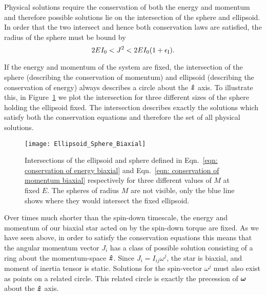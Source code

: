 \documentclass[../full_thesis/full_thesis.tex]{subfiles}
\begin{document}
Physical solutions require the conservation of both
the energy and momentum and therefore possible solutions lie on the intersection
of the sphere and ellipsoid. In order that the two intersect and hence both
conservation laws are satisfied, the radius of the sphere must be bound by
\begin{equation}
2EI_{0}<J^{2}<2EI_{0}(1+\epsilon_{\mathrm{I}}).
\label{eqn: orderings}
\end{equation}

If the energy and momentum of the system are fixed, the intersection of the
sphere (describing the conservation of momentum) and ellipsoid (describing the
conservation of energy) always describes a circle about the $\boldsymbol{\hat{z}}$ axis. To illustrate
this, in Figure~\ref{fig: plot sphere ellipse biaxial} we plot the intersection
for three different sizes of the sphere holding the ellipsoid fixed. The
intersection describes exactly the solutions which satisfy both the conservation
equations and therefore the set of all physical solutions.
\begin{figure}[ht]
\centering
\texttt{[image: Ellipsoid\_Sphere\_Biaxial]}
\caption{Intersections of the ellipsoid and sphere defined in Eqn.~\eqref{eqn:
conservation of energy biaxial} and Eqn.~\eqref{eqn: conservation of momentum
biaxial} respectively for three different values of $M$ at
fixed $E$. The spheres of radius $M$ are not visible, only the blue line shows
where they would intersect the fixed ellipsoid.}
\label{fig: plot sphere ellipse biaxial}
\end{figure}

Over times much shorter than the spin-down timescale, the energy and momentum
of our biaxial star acted on by the spin-down torque are fixed. As we have seen
above, in order to satisfy the conservation equations this means that the
angular momentum vector $J_i$ has a class of possible solution consisting of a
ring about the momentum-space $\boldsymbol{\hat{z}}$.  Since $J_{i}=I_{ij}\omega^{j}$, the star
is biaxial, and moment of inertia tensor is static. Solutions for the spin-vector $\omega^j$
must also exist as points on a related circle. This related circle is exactly
the precession of $\boldsymbol{\omega}$ about the $\boldsymbol{\hat{z}}$ axis.
\end{document}

